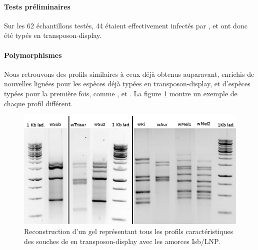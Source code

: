 \label{sec:résultats}

\paragraph{Tests préliminaires} %
\label{par:tests_pr_liminaires}
Sur les 62 échantillons testés, 44 étaient effectivement infectés par , et ont donc été typés en transposon-display.

\paragraph{Polymorphismes} %
\label{par:polymorphisme}
Nous retrouvons des profils similaires à ceux déjà obtenus auparavant\cite{memHH}, enrichis de nouvelles lignées pour les espèces déjà typées en transposon-display, et d'espèces typées pour la première fois, comme ,  et . %
La figure \ref{fig:profils} montre un exemple de chaque profil différent.

\begin{figure}[h]
	\begin{center}
		\includegraphics[width=150mm]{images/profils_crop.png}
	\end{center}
	\caption{Reconstruction d'un gel représentant tous les profils caractéristiques des souches de  en transposon-display avec les amorces Isb/LNP.}
	\label{fig:profils}
\end{figure}


